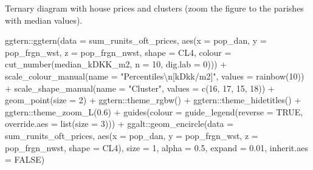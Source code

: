 \documentclass[
  12pt,
]{article}
\newenvironment{Shaded}{\begin{snugshade}}{\end{snugshade}}
\newcommand{\AttributeTok}[1]{\textcolor[rgb]{0.77,0.63,0.00}{#1}}
\newcommand{\ConstantTok}[1]{\textcolor[rgb]{0.00,0.00,0.00}{#1}}
\newcommand{\DecValTok}[1]{\textcolor[rgb]{0.00,0.00,0.81}{#1}}
\newcommand{\FloatTok}[1]{\textcolor[rgb]{0.00,0.00,0.81}{#1}}
\newcommand{\FunctionTok}[1]{\textcolor[rgb]{0.00,0.00,0.00}{#1}}
\newcommand{\NormalTok}[1]{#1}
\newcommand{\SpecialCharTok}[1]{\textcolor[rgb]{0.00,0.00,0.00}{#1}}
\newcommand{\StringTok}[1]{\textcolor[rgb]{0.31,0.60,0.02}{#1}}
\begin{document}
Ternary diagram with house prices and clusters (zoom the figure to the
parishes with median values).

\begin{Shaded}
\begin{Highlighting}[]
\NormalTok{ggtern}\SpecialCharTok{::}\FunctionTok{ggtern}\NormalTok{(}\AttributeTok{data =}\NormalTok{ sum\_runits\_oft\_prices,}
               \FunctionTok{aes}\NormalTok{(}\AttributeTok{x =}\NormalTok{ pop\_dan,}
                   \AttributeTok{y =}\NormalTok{ pop\_frgn\_wst,}
                   \AttributeTok{z =}\NormalTok{ pop\_frgn\_nwst,}
                   \AttributeTok{shape =}\NormalTok{ CL4,}
                   \AttributeTok{colour =} \FunctionTok{cut\_number}\NormalTok{(median\_kDKK\_m2,}
                                       \AttributeTok{n =} \DecValTok{10}\NormalTok{,}
                                       \AttributeTok{dig.lab =} \DecValTok{0}\NormalTok{))) }\SpecialCharTok{+}
  \FunctionTok{scale\_colour\_manual}\NormalTok{(}\AttributeTok{name =} \StringTok{"Percentiles}\SpecialCharTok{\textbackslash{}n}\StringTok{[kDkk/m2]"}\NormalTok{,}
                         \AttributeTok{values =} \FunctionTok{rainbow}\NormalTok{(}\DecValTok{10}\NormalTok{)) }\SpecialCharTok{+}
  \FunctionTok{scale\_shape\_manual}\NormalTok{(}\AttributeTok{name =} \StringTok{"Cluster"}\NormalTok{,}
                     \AttributeTok{values =} \FunctionTok{c}\NormalTok{(}\DecValTok{16}\NormalTok{, }\DecValTok{17}\NormalTok{, }\DecValTok{15}\NormalTok{, }\DecValTok{18}\NormalTok{)) }\SpecialCharTok{+}
  \FunctionTok{geom\_point}\NormalTok{(}\AttributeTok{size =} \DecValTok{2}\NormalTok{) }\SpecialCharTok{+}
\NormalTok{  ggtern}\SpecialCharTok{::}\FunctionTok{theme\_rgbw}\NormalTok{() }\SpecialCharTok{+}
\NormalTok{  ggtern}\SpecialCharTok{::}\FunctionTok{theme\_hidetitles}\NormalTok{() }\SpecialCharTok{+}
\NormalTok{  ggtern}\SpecialCharTok{::}\FunctionTok{theme\_zoom\_L}\NormalTok{(}\FloatTok{0.6}\NormalTok{) }\SpecialCharTok{+}
  \FunctionTok{guides}\NormalTok{(}\AttributeTok{colour =} \FunctionTok{guide\_legend}\NormalTok{(}\AttributeTok{reverse =} \ConstantTok{TRUE}\NormalTok{,}
                               \AttributeTok{override.aes =} \FunctionTok{list}\NormalTok{(}\AttributeTok{size =} \DecValTok{3}\NormalTok{))) }\SpecialCharTok{+}
\NormalTok{  ggalt}\SpecialCharTok{::}\FunctionTok{geom\_encircle}\NormalTok{(}\AttributeTok{data =}\NormalTok{ sum\_runits\_oft\_prices,}
                       \FunctionTok{aes}\NormalTok{(}\AttributeTok{x =}\NormalTok{ pop\_dan,}
                           \AttributeTok{y =}\NormalTok{ pop\_frgn\_wst,}
                           \AttributeTok{z =}\NormalTok{ pop\_frgn\_nwst,}
                           \AttributeTok{shape =}\NormalTok{ CL4),}
                       \AttributeTok{size =} \DecValTok{1}\NormalTok{,}
                       \AttributeTok{alpha =} \FloatTok{0.5}\NormalTok{,}
                       \AttributeTok{expand =} \FloatTok{0.01}\NormalTok{,}
                       \AttributeTok{inherit.aes =} \ConstantTok{FALSE}\NormalTok{)}
\end{Highlighting}
\end{Shaded}
\end{document}
